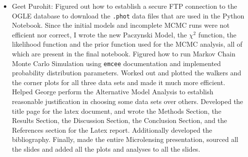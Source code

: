\documentclass{article}
\begin{document}
\begin{itemize}
\item Geet Purohit: Figured out how to establish a secure FTP connection to the OGLE database to download the \texttt{.phot} data files that are used in the Python Notebook. Since the initial models and incomplete MCMC runs were not efficient nor correct, I wrote the new Paczynski Model, the $\chi^2$ function, the likelihood function and the prior function used for the MCMC analysis, all of which are present in the final notebook. Figured how to run Markov Chain Monte Carlo Simulation using \texttt{emcee} documentation and implemented probability distribution parameters. Worked out and plotted the walkers and the corner plots for all three data sets and made it much more efficient. Helped George perform the Alternative Model Analysis to establish reasonable justification in choosing some data sets over others. Developed the title page for the latex document, and wrote the Methods Section, the Results Section, the Discussion Section, the Conclusion Section, and the References section for the Latex report. Additionally developed the bibliography. Finally, made the entire Microlensing presentation, sourced all the slides and added all the plots and analyses to all the slides.
\end{itemize}

\setlength{}
\printbibliography
\end{document}
